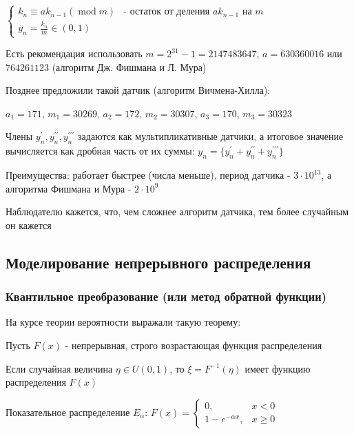 \documentclass[12pt]{article}
\begin{document}
\begin{enumerate}[label*=\Roman*. ]
    $\begin{cases}
        k_n \equiv a k_{n - 1} (\operatorname{mod} m) & \text{- остаток от деления }ak_{n - 1}\text{ на }m \\
        y_n = \frac{k_n}{m} \in (0, 1)
    \end{cases}$

    Есть рекомендация использовать $m = 2^{31} - 1 = 2147483647$, $a = 630360016$ или $764261123$ (алгоритм Дж. Фишмана и Л. Мура)

    \mediumvspace

    Позднее предложили такой датчик (алгоритм Вичмена-Хилла):

    $a_1 = 171$, $m_1 = 30269$, $a_2 = 172$, $m_2 = 30307$, $a_3 = 170$, $m_3 = 30323$ 

    Члены $y_n^\prime, y_n^{\prime\prime}, y_n^{\prime\prime\prime}$ задаются как мультипликативные датчики, а итоговое значение вычисляется как дробная часть от их суммы: $y_n = \{y_n^\prime + y_n^{\prime\prime} + y_n^{\prime\prime\prime}\}$

    Преимущества: работает быстрее (числа меньше), период датчика - $3 \cdot 10^{13}$, а алгоритма Фишмана и Мура - $2 \cdot 10^9$

    Наблюдателю кажется, что, чем сложнее алгоритм датчика, тем более случайным он кажется

\end{enumerate}

\subsection{Моделирование непрерывного распределения}

\subsubsection{Квантильное преобразование (или метод обратной функции)}

На курсе теории вероятности выражали такую теорему:

\begin{MyTheorem}
    \Ths Пусть $F(x)$ - непрерывная, строго возрастающая функция распределения

    Если случайная величина $\eta \in U(0, 1)$, то $\xi = F^{-1}(\eta)$ имеет функцию распределения $F(x)$
\end{MyTheorem}

\Ex Показательное распределение $E_\alpha$: $F(x) = \begin{cases}0, & x < 0 \\ 1 - e^{-\alpha x}, & x \geq 0\end{cases}$
\end{document}
